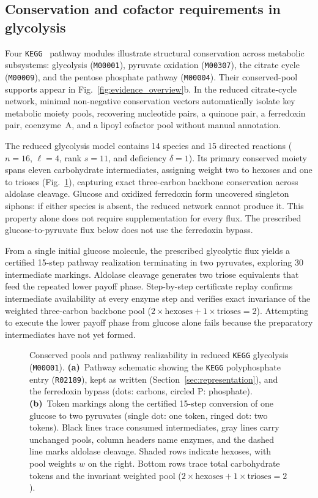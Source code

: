 \documentclass[10pt,a4paper,fleqn]{article}
\begin{document}
\subsection{Conservation and cofactor requirements in glycolysis}
\label{sec:results_kegg}

Four \texttt{KEGG}~\cite{kanehisa2025kegg} pathway modules illustrate structural conservation across metabolic subsystems: glycolysis (\texttt{M00001}), pyruvate oxidation (\texttt{M00307}), the citrate cycle (\texttt{M00009}), and the pentose phosphate pathway (\texttt{M00004}). Their conserved-pool supports appear in Fig.~\ref{fig:evidence_overview}b. In the reduced citrate-cycle network, minimal non-negative conservation vectors automatically isolate key metabolic moiety pools, recovering nucleotide pairs, a quinone pair, a ferredoxin pair, coenzyme~A, and a lipoyl cofactor pool without manual annotation.

The reduced glycolysis model contains 14 species and 15 directed reactions ($n=16$, $\ell=4$, rank $s=11$, and deficiency $\delta=1$). Its primary conserved moiety spans eleven carbohydrate intermediates, assigning weight two to hexoses and one to trioses (Fig.~\ref{fig:glycolysis}), capturing exact three-carbon backbone conservation across aldolase cleavage. Glucose and oxidized ferredoxin form uncovered singleton siphons: if either species is absent, the reduced network cannot produce it. This property alone does not require supplementation for every flux. The prescribed glucose-to-pyruvate flux below does not use the ferredoxin bypass.

From a single initial glucose molecule, the prescribed glycolytic flux yields a certified 15-step pathway realization terminating in two pyruvates, exploring 30 intermediate markings. Aldolase cleavage generates two triose equivalents that feed the repeated lower payoff phase. Step-by-step certificate replay confirms intermediate availability at every enzyme step and verifies exact invariance of the weighted three-carbon backbone pool ($2\times\text{hexoses} + 1\times\text{trioses} = 2$). Attempting to execute the lower payoff phase from glucose alone fails because the preparatory intermediates have not yet formed.

\begin{figure}[!htbp]
    \centering
    
    \caption{Conserved pools and pathway realizability in reduced \texttt{KEGG} glycolysis (\texttt{M00001}). \textbf{(a)}~Pathway schematic showing the \texttt{KEGG} polyphosphate entry (\texttt{R02189}), kept as written (Section~\ref{sec:representation}), and the ferredoxin bypass (dots: carbons, circled P: phosphate). \textbf{(b)}~Token markings along the certified 15-step conversion of one glucose to two pyruvates (single dot: one token, ringed dot: two tokens). Black lines trace consumed intermediates, gray lines carry unchanged pools, column headers name enzymes, and the dashed line marks aldolase cleavage. Shaded rows indicate hexoses, with pool weights $w$ on the right. Bottom rows trace total carbohydrate tokens and the invariant weighted pool ($2\times\text{hexoses} + 1\times\text{trioses} = 2$).}
    \label{fig:glycolysis}
\end{figure}
\end{document}
